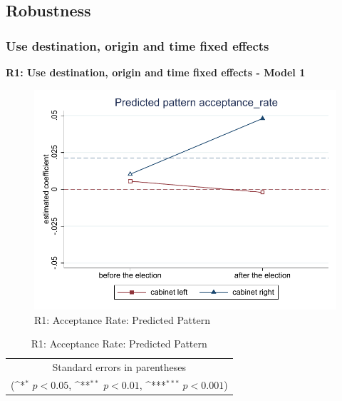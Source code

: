 \documentclass[10pt,a4paper]{scrartcl}
\begin{document}


\FloatBarrier
\clearpage
\subsection{Robustness}

\subsubsection{Use destination, origin and time fixed effects}
\textbf{ R1: Use destination, origin and time fixed effects - Model 1}

\begin{figure}[!ht]
	\centering
	\includegraphics[width=1\textwidth]{figures_edited/acceptance_rate_graph1_R1.pdf}
	\caption{R1: Acceptance Rate: Predicted Pattern}
\end{figure}

\begin{table}[!ht]\centering
	\renewcommand{\arraystretch}{1.25}
	\def\sym#1{\ifmmode^{#1}\else\(^{#1}\)\fi}
	\caption{R1: Acceptance Rate: Predicted Pattern}
	\begin{tabular}{l*{2}{c}}
		\hline\hline
		
		\hline\hline
		\multicolumn{3}{c}{\footnotesize Standard errors in parentheses} \\
		\multicolumn{3}{c}{\footnotesize (\sym{*} \(p<0.05\), \sym{**} \(p<0.01\), \sym{***} \(p<0.001\))}\\
	\end{tabular}
\end{table}
\end{document}

